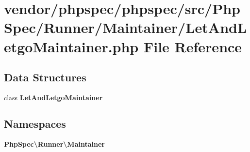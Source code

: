 \section{vendor/phpspec/phpspec/src/\+Php\+Spec/\+Runner/\+Maintainer/\+Let\+And\+Letgo\+Maintainer.php File Reference}
\label{_let_and_letgo_maintainer_8php}
\subsection*{Data Structures}
\begin{DoxyCompactItemize}
\item 
class {\bf Let\+And\+Letgo\+Maintainer}
\end{DoxyCompactItemize}
\subsection*{Namespaces}
\begin{DoxyCompactItemize}
\item 
 {\bf Php\+Spec\textbackslash{}\+Runner\textbackslash{}\+Maintainer}
\end{DoxyCompactItemize}
